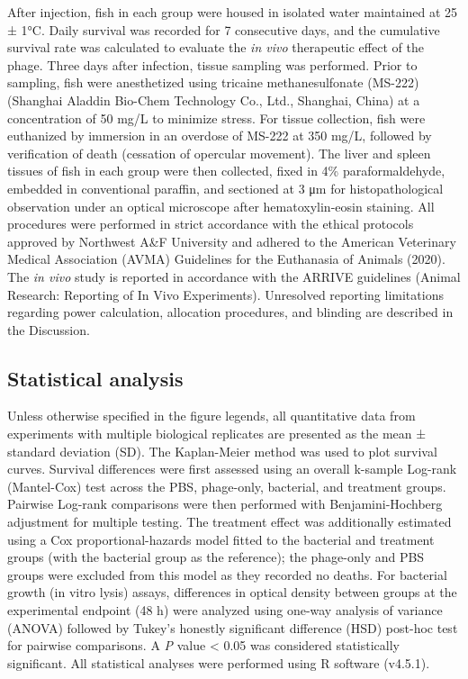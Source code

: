 After injection, fish in each group were housed in isolated water
maintained at 25 ± 1°C. Daily survival was recorded for 7 consecutive
days, and the cumulative survival rate was calculated to evaluate the
\emph{in vivo} therapeutic effect of the phage. Three days after
infection, tissue sampling was performed. Prior to sampling, fish were
anesthetized using tricaine methanesulfonate (MS-222) (Shanghai Aladdin
Bio-Chem Technology Co., Ltd., Shanghai, China) at a concentration of 50
mg/L to minimize stress. For tissue collection, fish were euthanized by
immersion in an overdose of MS-222 at 350 mg/L, followed by verification
of death (cessation of opercular movement). The liver and spleen tissues
of fish in each group were then collected, fixed in 4\%
paraformaldehyde, embedded in conventional paraffin, and sectioned at 3 μm
for histopathological observation under an optical microscope after
hematoxylin-eosin staining. All procedures were performed in strict
accordance with the ethical protocols approved by Northwest A\&F
University and adhered to the American Veterinary Medical Association
(AVMA) Guidelines for the Euthanasia of Animals (2020). The \emph{in
vivo} study is reported in accordance with the ARRIVE guidelines (Animal
Research: Reporting of In Vivo Experiments). Unresolved reporting
limitations regarding power calculation, allocation procedures, and blinding
are described in the Discussion.

\subsection{Statistical analysis}\label{statistical-analysis}

Unless otherwise specified in the figure legends, all quantitative data
from experiments with multiple biological replicates are presented as the mean ±
standard deviation (SD). The Kaplan-Meier method was used to plot
survival curves. Survival differences were first assessed using an
overall k-sample Log-rank (Mantel-Cox) test across the PBS, phage-only,
bacterial, and treatment groups. Pairwise Log-rank comparisons were then
performed with Benjamini-Hochberg adjustment for multiple testing. The
treatment effect was additionally estimated using a Cox
proportional-hazards model fitted to the bacterial and treatment groups
(with the bacterial group as the reference); the phage-only and PBS
groups were excluded from this model as they recorded no deaths. For bacterial growth (in
vitro lysis) assays, differences in optical density between groups at
the experimental endpoint (48 h) were analyzed using one-way analysis of
variance (ANOVA) followed by Tukey's honestly significant difference (HSD)
post-hoc test for pairwise comparisons. A \textit{P} value \textless{} 0.05 was
considered statistically significant. All statistical analyses were performed using
R software (v4.5.1).

